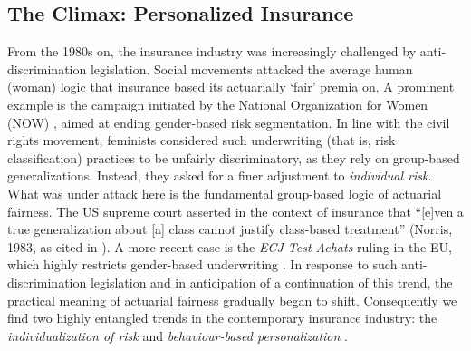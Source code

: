 \documentclass[11pt]{article} %
\begin{document}
\subsection{The Climax: Personalized Insurance}
\label{sec:personalized}
From the 1980s on, the insurance industry was increasingly challenged by anti-discrimination legislation. Social movements attacked the average human (woman) logic that insurance based its actuarially `fair' premia on. A prominent example is the campaign initiated by the National Organization for Women (NOW) \citep{krippner2022person,krippner2023unmasked}, aimed at ending gender-based risk segmentation. In line with the civil rights movement, feminists considered such underwriting (that is, risk classification) practices to be unfairly discriminatory, as they rely on group-based generalizations. Instead, they asked for a finer adjustment to \textit{individual risk}. What was under attack here is the fundamental group-based logic of actuarial fairness. The US supreme court asserted in the context of insurance that ``[e]ven a true generalization about [a] class cannot justify
class-based treatment'' (Norris, 1983, as cited in \citet{avraham2017discrimination}). A more recent case is the \textit{ECJ Test-Achats} ruling in the EU, which highly restricts gender-based underwriting \citep{rebert2015right,cevolini2022actuarial}. 
In response to such anti-discrimination legislation and in anticipation of a continuation of this trend, the practical meaning of actuarial fairness gradually began to shift.
Consequently we find two highly entangled trends in the contemporary insurance industry: the \textit{individualization of risk} and \textit{behaviour-based personalization} \citep{cevolini2020pool,mcfall2020personalisation}.
\end{document}
